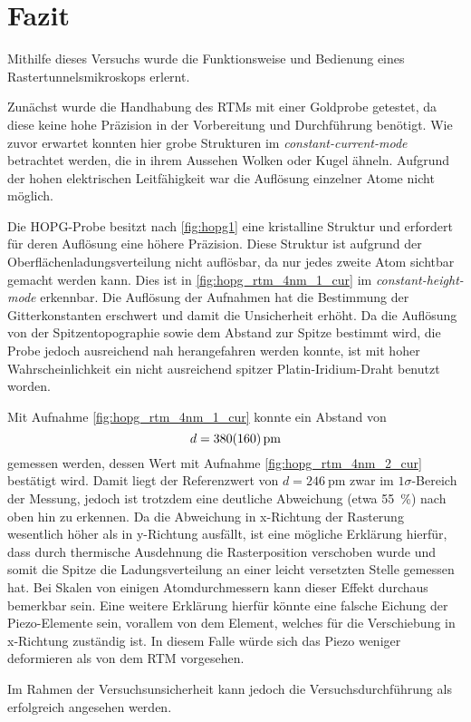 \section{Fazit}\label{sec:fazit}
Mithilfe dieses Versuchs wurde die Funktionsweise und Bedienung eines Rastertunnelsmikroskops 
erlernt.\\\par
Zunächst wurde die Handhabung des RTMs mit einer Goldprobe getestet, da diese keine hohe 
Präzision in der Vorbereitung und Durchführung benötigt. Wie zuvor 
erwartet konnten hier grobe Strukturen im \emph{constant-current-mode} betrachtet werden, 
die in ihrem Aussehen Wolken oder Kugel ähneln. Aufgrund der hohen elektrischen 
Leitfähigkeit war die Auflösung einzelner Atome nicht möglich.\\\par
Die HOPG-Probe besitzt nach \cref{fig:hopg1} eine kristalline Struktur und erfordert
für deren Auflösung eine höhere Präzision. Diese Struktur ist aufgrund 
der Oberflächenladungsverteilung nicht auflösbar, da nur jedes zweite Atom sichtbar gemacht 
werden kann. Dies ist in \cref{fig:hopg_rtm_4nm_1_cur} im \emph{constant-height-mode} 
erkennbar. Die Auflösung der Aufnahmen hat die Bestimmung der Gitterkonstanten erschwert und 
damit die Unsicherheit erhöht. Da die Auflösung von der Spitzentopographie sowie dem Abstand 
zur Spitze bestimmt wird, die Probe jedoch ausreichend nah herangefahren werden konnte, 
ist mit hoher Wahrscheinlichkeit ein nicht ausreichend spitzer Platin-Iridium-Draht benutzt worden.\par 
Mit Aufnahme \cref{fig:hopg_rtm_4nm_1_cur} konnte ein Abstand von 
\[d = \SI{380\pm 160}{\pm}\]
gemessen werden, dessen Wert mit Aufnahme \cref{fig:hopg_rtm_4nm_2_cur} bestätigt wird. Damit 
liegt der Referenzwert von $d = \SI{246}{\pm}$ \cite{rtm-leitpfaden} zwar im $1\sigma$-Bereich der 
Messung, jedoch ist trotzdem eine deutliche Abweichung (etwa \SI{55}{\percent}) nach oben hin zu erkennen. Da die Abweichung 
in x-Richtung der Rasterung wesentlich höher als in y-Richtung ausfällt, ist eine mögliche Erklärung 
hierfür, dass durch thermische Ausdehnung die Rasterposition verschoben wurde und somit 
die Spitze die Ladungsverteilung an einer leicht versetzten Stelle gemessen hat. Bei Skalen von einigen
Atomdurchmessern kann dieser Effekt durchaus bemerkbar sein. Eine weitere Erklärung hierfür könnte
eine falsche Eichung der Piezo-Elemente sein, vorallem von dem Element, welches für 
die Verschiebung in x-Richtung zuständig ist. In diesem Falle würde sich das Piezo 
weniger deformieren als von dem RTM vorgesehen. \par
Im Rahmen der Versuchsunsicherheit kann jedoch die Versuchsdurchführung als erfolgreich 
angesehen werden.